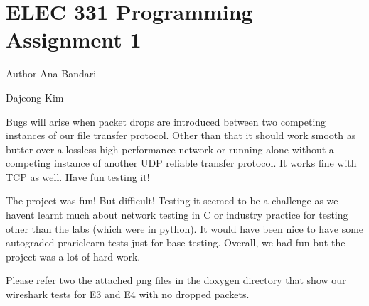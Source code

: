 \chapter{ELEC 331 Programming Assignment 1}
\hypertarget{index}{}\label{index}
\begin{DoxyAuthor}{Author}
Ana Bandari 

Dajeong Kim
\end{DoxyAuthor}
Bugs will arise when packet drops are introduced between two competing instances of our file transfer protocol. Other than that it should work smooth as butter over a lossless high performance network or running alone without a competing instance of another UDP reliable transfer protocol. It works fine with TCP as well. Have fun testing it!

The project was fun! But difficult! Testing it seemed to be a challenge as we haven\textquotesingle{}t learnt much about network testing in C or industry practice for testing other than the labs (which were in python). It would have been nice to have some autograded prarielearn tests just for base testing. Overall, we had fun but the project was a lot of hard work.

Please refer two the attached png files in the doxygen directory that show our wireshark tests for E3 and E4 with no dropped packets.

  